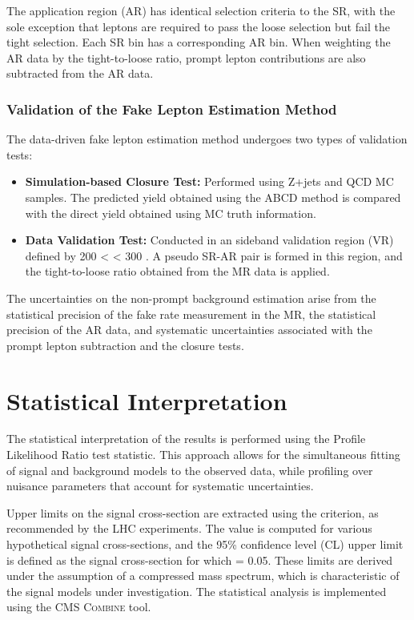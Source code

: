 The application region (AR) has identical selection criteria to the SR, with the sole exception that leptons are required to pass the loose selection but fail the tight selection. Each SR bin has a corresponding AR bin. When weighting the AR data by the tight-to-loose ratio, prompt lepton contributions are also subtracted from the AR data.

\subsubsection{Validation of the Fake Lepton Estimation Method}
The data-driven fake lepton estimation method undergoes two types of validation tests:
\begin{itemize}
    \item \textbf{Simulation-based Closure Test:} Performed using Z+jets and QCD MC samples. The predicted yield obtained using the ABCD method is compared with the direct yield obtained using MC truth information.
    \item \textbf{Data Validation Test:} Conducted in an \ETmiss sideband validation region (VR) defined by 200 < \ETmiss < 300 \GeV. A pseudo SR-AR pair is formed in this region, and the tight-to-loose ratio obtained from the MR data is applied.
\end{itemize}
The uncertainties on the non-prompt background estimation arise from the statistical precision of the fake rate measurement in the MR, the statistical precision of the AR data, and systematic uncertainties associated with the prompt lepton subtraction and the closure tests.

\section{Statistical Interpretation}

The statistical interpretation of the results is performed using the Profile Likelihood Ratio test statistic. This approach allows for the simultaneous fitting of signal and background models to the observed data, while profiling over nuisance parameters that account for systematic uncertainties.

Upper limits on the signal cross-section are extracted using the \CLs criterion, as recommended by the LHC experiments. The \CLs value is computed for various hypothetical signal cross-sections, and the 95\% confidence level (CL) upper limit is defined as the signal cross-section for which \CLs = 0.05. These limits are derived under the assumption of a compressed mass spectrum, which is characteristic of the signal models under investigation. The statistical analysis is implemented using the \textsc{CMS Combine} tool.